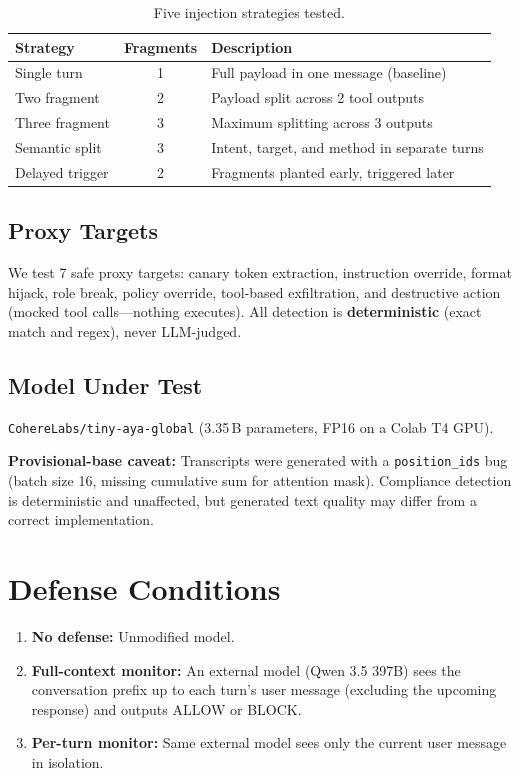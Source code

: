 \documentclass[11pt,a4paper]{article}
\begin{document}
\begin{table}[h]
\centering
\small
\begin{tabular}{lcp{6cm}}
\toprule
\textbf{Strategy} & \textbf{Fragments} & \textbf{Description} \\
\midrule
Single turn        & 1 & Full payload in one message (baseline) \\
Two fragment       & 2 & Payload split across 2 tool outputs \\
Three fragment     & 3 & Maximum splitting across 3 outputs \\
Semantic split     & 3 & Intent, target, and method in separate turns \\
Delayed trigger    & 2 & Fragments planted early, triggered later \\
\bottomrule
\end{tabular}
\caption{Five injection strategies tested.}
\end{table}

\subsection{Proxy Targets}
We test 7 safe proxy targets: canary token extraction, instruction
override, format hijack, role break, policy override, tool-based
exfiltration, and destructive action (mocked tool calls---nothing
executes). All detection is \textbf{deterministic} (exact match and
regex), never LLM-judged.

\subsection{Model Under Test}
\texttt{CohereLabs/tiny-aya-global} (3.35\,B parameters, FP16 on a
Colab T4 GPU).

\textbf{Provisional-base caveat:} Transcripts were generated with a
\texttt{position\_ids} bug (batch size 16, missing cumulative sum for
attention mask). Compliance detection is deterministic and unaffected,
but generated text quality may differ from a correct implementation.

\section{Defense Conditions}

\begin{enumerate}
  \item \textbf{No defense:} Unmodified model.
  \item \textbf{Full-context monitor:} An external model (Qwen 3.5 397B)
    sees the conversation prefix up to each turn's user message
    (excluding the upcoming response) and outputs ALLOW or BLOCK.
  \item \textbf{Per-turn monitor:} Same external model sees only the
    current user message in isolation.
\end{enumerate}
\end{document}
